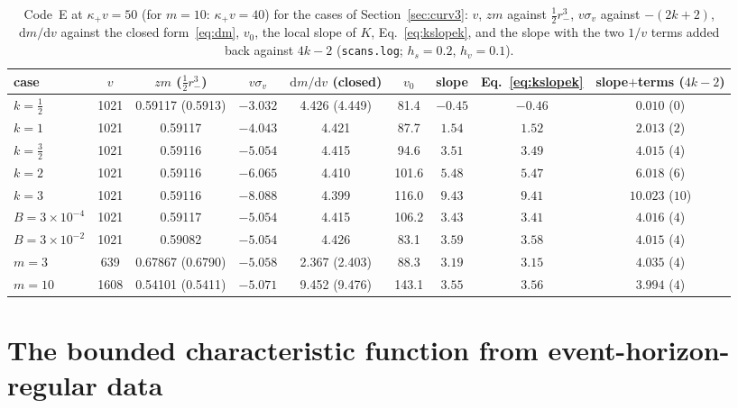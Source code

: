 \documentclass[11pt]{article}
\begin{document}
\begin{table}[ht]\centering\footnotesize\setlength{\tabcolsep}{3pt}
\caption{Code~E at $\kappa_+v=50$ (for $m=10$: $\kappa_+v=40$) for the cases of Section~\ref{sec:curv3}: $v$, $zm$ against $\tfrac12r_-^{3}$, $v\sigma_v$ against $-(2k+2)$, $\mathrm dm/\mathrm dv$ against the closed form~\eqref{eq:dm}, $v_0$, the local slope of $K$, Eq.~\eqref{eq:kslopek}, and the slope with the two $1/v$ terms added back against $4k-2$ (\texttt{scans.log}; $h_s=0.2$, $h_v=0.1$).}\label{tab:scan}
\begin{tabular}{lcccccccc}
\toprule
case & $v$ & $zm$ ($\tfrac12r_-^{3}$) & $v\sigma_v$ & $\mathrm dm/\mathrm dv$ (closed) & $v_0$ & slope & Eq.~\eqref{eq:kslopek} & slope$+$terms ($4k-2$)\\\midrule
$k=\tfrac12$ & 1021 & 0.59117 (0.5913) & $-3.032$ & 4.426 (4.449) & 81.4 & $-0.45$ & $-0.46$ & $0.010$ ($0$)\\
$k=1$ & 1021 & 0.59117 & $-4.043$ & 4.421 & 87.7 & $1.54$ & $1.52$ & $2.013$ ($2$)\\
$k=\tfrac32$ & 1021 & 0.59116 & $-5.054$ & 4.415 & 94.6 & $3.51$ & $3.49$ & $4.015$ ($4$)\\
$k=2$ & 1021 & 0.59116 & $-6.065$ & 4.410 & 101.6 & $5.48$ & $5.47$ & $6.018$ ($6$)\\
$k=3$ & 1021 & 0.59116 & $-8.088$ & 4.399 & 116.0 & $9.43$ & $9.41$ & $10.023$ ($10$)\\
$B=3\times10^{-4}$ & 1021 & 0.59117 & $-5.054$ & 4.415 & 106.2 & $3.43$ & $3.41$ & $4.016$ ($4$)\\
$B=3\times10^{-2}$ & 1021 & 0.59082 & $-5.054$ & 4.426 & 83.1 & $3.59$ & $3.58$ & $4.015$ ($4$)\\
$m=3$ & 639 & 0.67867 (0.6790) & $-5.058$ & 2.367 (2.403) & 88.3 & $3.19$ & $3.15$ & $4.035$ ($4$)\\
$m=10$ & 1608 & 0.54101 (0.5411) & $-5.071$ & 9.452 (9.476) & 143.1 & $3.55$ & $3.56$ & $3.994$ ($4$)\\\bottomrule
\end{tabular}
\end{table}

\section{The bounded characteristic function from event-horizon-regular data}
\label{sec:model2}
\end{document}
